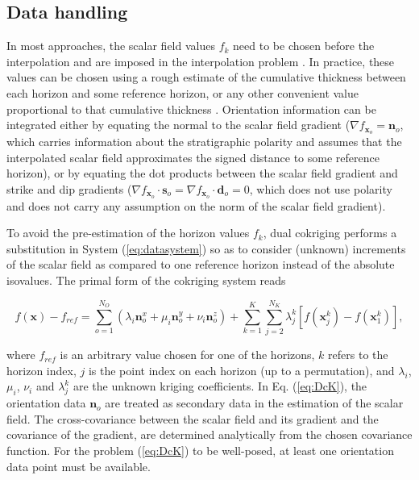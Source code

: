 \documentclass[final]{ring20}
\newcommand{\bx}{\mathbf{x}}
\newcommand{\bn}{\mathbf{n}}
\begin{document}
\subsection {Data handling}

In most approaches, the scalar field values $f_k$ need to be chosen before the interpolation and are imposed in the interpolation problem \citep[e.g., ][]{Frank2007CG,Hillier2014MG,Renaudeau2019MG}. In practice, these values can be chosen using a rough estimate of the cumulative thickness between each horizon and some reference horizon, or any other convenient value proportional to that cumulative thickness \citep{Caumon2013GaRSITo,Collon2016I}. Orientation information can be integrated either by equating the normal to the scalar field gradient ($\nabla f_{\bx_o} = \mathbf{n}_o$, which  carries information about the stratigraphic polarity and assumes that the interpolated scalar field approximates the signed distance to some reference horizon), or by equating the dot products between the scalar field gradient and strike and dip gradients ($\nabla f_{\bx_o} \cdot \mathbf{s}_o = \nabla f_{\bx_o} \cdot \mathbf{d}_o = 0$, which does not use polarity and does not carry any assumption on the norm of the scalar field gradient). 

To avoid the pre-estimation of the horizon values $f_k$, dual cokriging \citep[DcK, ][]{Lajaunie1997MG,Chiles04OMSMP} performs a substitution in System (\ref{eq:datasystem}) so as to consider (unknown) increments of the scalar field as compared to one reference horizon instead of the absolute isovalues. The primal form of the cokriging system reads

\begin{equation}
\label{eq:DcK}
f(\bx) - f_{ref} = \sum_{o=1}^{N_O} (\lambda_i \bn_o^x + \mu_i \bn_o^y + \nu_i \bn_o^z) + \sum_{k=1}^{K} \sum_{j=2}^{N_K} \lambda_{j}^{k}[f(\bx_j^k) - f(\bx_1^k)], 
\end{equation}

where $f_{ref}$ is an arbitrary value chosen for one of the horizons, $k$ refers to the horizon index, $j$ is the point index on each horizon (up to a permutation), and $\lambda_i$, $\mu_i$, $\nu_i$ and $\lambda_j^k$ are the unknown kriging coefficients. In Eq. (\ref{eq:DcK}), the orientation data $\bn_o$ are treated as secondary data in the estimation of the scalar field. The cross-covariance between the scalar field and its gradient and the covariance of the gradient, are determined analytically from the chosen covariance function. For the problem (\ref{eq:DcK}) to be well-posed, at least one orientation data point must be available. 
\end{document}
